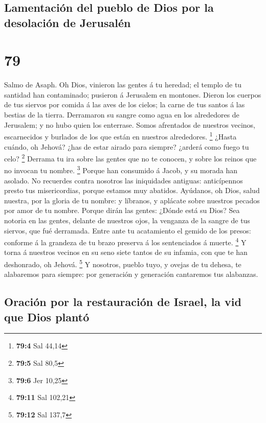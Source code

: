 \hypertarget{lamentaciuxf3n-del-pueblo-de-dios-por-la-desolaciuxf3n-de-jerusaluxe9n}{%
\subsection{Lamentación del pueblo de Dios por la desolación de
Jerusalén}\label{lamentaciuxf3n-del-pueblo-de-dios-por-la-desolaciuxf3n-de-jerusaluxe9n}}

\hypertarget{section-78}{%
\section{79}\label{section-78}}

 Salmo de Asaph. Oh Dios, vinieron las gentes á tu heredad;
el templo de tu santidad han contaminado; pusieron á Jerusalem en
montones.  Dieron los cuerpos de tus siervos por comida á
las aves de los cielos; la carne de tus santos á las bestias de la
tierra.  Derramaron su sangre como agua en los alrededores
de Jerusalem; y no hubo quien los enterrase.  Somos
afrentados de nuestros vecinos, escarnecidos y burlados de los que están
en nuestros alrededores. \footnote{\textbf{79:4} Sal 44,14} 
¿Hasta cuándo, oh Jehová? ¿has de estar airado para siempre? ¿arderá
como fuego tu celo? \footnote{\textbf{79:5} Sal 80,5} 
Derrama tu ira sobre las gentes que no te conocen, y sobre los reinos
que no invocan tu nombre. \footnote{\textbf{79:6} Jer 10,25}
 Porque han consumido á Jacob, y su morada han asolado.
 No recuerdes contra nosotros las iniquidades antiguas:
anticípennos presto tus misericordias, porque estamos muy abatidos.
 Ayúdanos, oh Dios, salud nuestra, por la gloria de tu
nombre: y líbranos, y aplácate sobre nuestros pecados por amor de tu
nombre.  Porque dirán las gentes: ¿Dónde está su Dios? Sea
notoria en las gentes, delante de nuestros ojos, la venganza de la
sangre de tus siervos, que fué derramada.  Entre ante tu
acatamiento el gemido de los presos: conforme á la grandeza de tu brazo
preserva á los sentenciados á muerte. \footnote{\textbf{79:11} Sal
  102,21}  Y torna á nuestros vecinos en su seno siete
tantos de su infamia, con que te han deshonrado, oh Jehová. \footnote{\textbf{79:12}
  Sal 137,7}  Y nosotros, pueblo tuyo, y ovejas de tu
dehesa, te alabaremos para siempre: por generación y generación
cantaremos tus alabanzas.

\hypertarget{oraciuxf3n-por-la-restauraciuxf3n-de-israel-la-vid-que-dios-plantuxf3}{%
\subsection{Oración por la restauración de Israel, la vid que Dios
plantó}\label{oraciuxf3n-por-la-restauraciuxf3n-de-israel-la-vid-que-dios-plantuxf3}}

